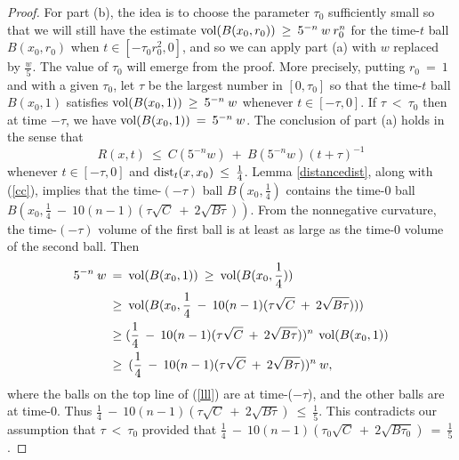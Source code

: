 \begin{proof}
For part (b), the idea is to choose the parameter
$\tau_0$ sufficiently small so that
we will still have the estimate
$\operatorname{vol}(B(x_0, r_0)) \: \ge \: 5^{-n} \: w \: r_0^n$ for the time-$t$ ball
$B(x_0, r_0)$ when $t \in [-\tau_0 r_0^2, 0]$,
and so we can apply part (a) with $w$ replaced by $\frac{w}{5}$.
The value of $\tau_0$ will emerge from the proof.
More precisely, putting $r_0 \: = \: 1$ and with a given
$\tau_0$, let $\tau$ be the
largest number in $[0, \tau_0]$ so that the time-$t$ ball
$B(x_0, 1)$ satisfies
$\operatorname{vol}(B(x_0, 1)) \: \ge \: 5^{-n} \: w$ whenever $t \in [-\tau, 0]$.
If $\tau \: < \: \tau_0$ then at time $- \tau$, we have
$\operatorname{vol}(B(x_0, 1)) \: = \: 5^{-n} \: w$.
The conclusion of part (a) holds in the sense that
\begin{equation} \label{cc}
R(x, t) \: \le \: C(5^{-n} w) \: + \: B(5^{-n} w) ( t + \tau)^{-1}
\end{equation}
whenever $t \in [- \tau, 0]$ and $\operatorname{dist}_t(x, x_0) \: \le \: \frac14$.
Lemma \ref{distancedist}, along with (\ref{cc}), implies that the
time-$(- \tau)$ ball $B(x_0, \frac14)$ contains the
time-$0$ ball $B(x_0, \frac14 \: - \: 10(n-1)(\tau \sqrt{C} \: + \:
2 \sqrt{B \tau}))$. From the nonnegative curvature, the
time-$(- \tau)$ volume of the first ball is at least as large as the
time-$0$ volume of the second ball.  Then
\begin{align} \label{lll}
5^{-n} \: w \: & = \: \operatorname{vol}(B(x_0, 1))
\: \ge \: \operatorname{vol}(B(x_0, \frac14)) \\
& \ge \:
\operatorname{vol}(B(x_0, \frac14 \: - \: 10(n-1)(\tau \sqrt{C} \: + \:
2 \sqrt{B \tau}))) \notag \\
& \ge
(\frac14 \: - \: 10(n-1)(\tau \sqrt{C} \: + \:
2 \sqrt{B \tau}))^n \: \operatorname{vol}(B(x_0, 1)) \notag \\
& \ge \:
(\frac14 \: - \: 10(n-1)(\tau \sqrt{C} \: + \:
2 \sqrt{B \tau}))^n \: w, \notag
\end{align}
where the balls on the top line of (\ref{lll}) are at time-($- \tau$),
and the other balls are at time-$0$.
Thus $\frac14 \: - \: 10(n-1)(\tau \sqrt{C} \: + \:
2 \sqrt{B \tau}) \: \le \: \frac15$.
This contradicts our assumption
that $\tau \: < \: \tau_0$ provided that
$\frac14 \: - \: 10(n-1)(\tau_0 \sqrt{C} \: + \:
2 \sqrt{B \tau_0}) \: = \: \frac15$.
\end{proof}

